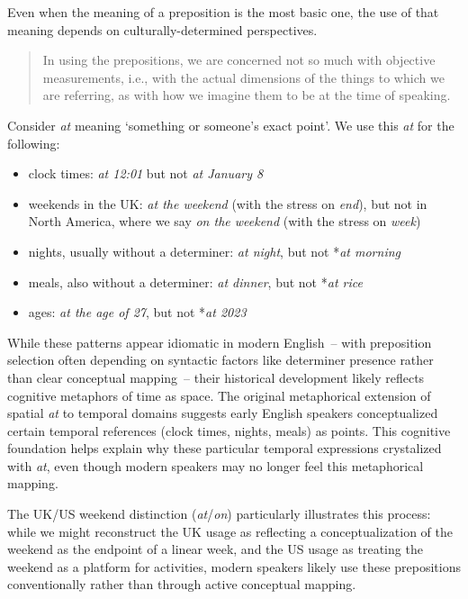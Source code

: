 Even when the meaning of a preposition is the most basic one, the use of that meaning depends on culturally-determined perspectives.

\begin{quote}
    In using the prepositions, we are concerned not so much with objective measurements, i.e., with the actual dimensions of the things to which we are referring, as with how we imagine them to be at the time of speaking. \citep{close1992}
\end{quote}

Consider \textit{at} meaning `something or someone's exact point'. We use this \textit{at} for
the following:

\begin{itemize}
    \item clock times: \textit{at 12:01} but not \textit{at January 8}
    \item weekends in the UK: \textit{at the weekend} (with the stress on \textit{end}), but not in
    North America, where we say \textit{on the weekend} (with the stress on \textit{week})
    \item nights, usually without a determiner: \textit{at night}, but not *\textit{at morning}
    \item meals, also without a determiner: \textit{at dinner}, but not *\textit{at rice}
    \item ages: \textit{at the age of 27}, but not *\textit{at 2023}
\end{itemize}
While these patterns appear idiomatic in modern English~-- with preposition selection often depending on syntactic factors like determiner presence rather than clear conceptual mapping~-- their historical development likely reflects cognitive metaphors of time as space. The original metaphorical extension of spatial \textit{at} to temporal domains suggests early English speakers conceptualized certain temporal references (clock times, nights, meals) as points. This cognitive foundation helps explain why these particular temporal expressions crystalized with \textit{at}, even though modern speakers may no longer feel this metaphorical mapping.

The UK/US weekend distinction (\textit{at}/\textit{on}) particularly illustrates this process: while we might reconstruct the UK usage as reflecting a conceptualization of the weekend as the endpoint of a linear week, and the US usage as treating the weekend as a platform for activities, modern speakers likely use these prepositions conventionally rather than through active conceptual mapping.

